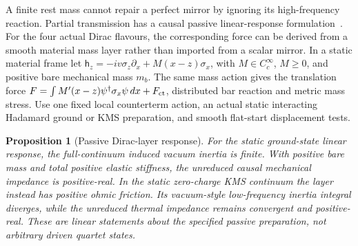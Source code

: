 \documentclass[12pt,a4paper]{article}
\newtheorem{proposition}[theorem]{Proposition}
\begin{document}
A finite rest mass cannot repair a perfect mirror by ignoring its
high-frequency reaction. Partial transmission has a causal passive
linear-response formulation~\cite{JaekelReynaud1992}. For the four
actual Dirac flavours, the corresponding force can be derived from a
smooth material mass layer rather than imported from a scalar mirror.
In a static material frame let
$\mathsf h_z=-iv\sigma_z\partial_x+M(x-z)\sigma_x$, with
$M\in C_c^\infty$, $M\ge0$, and positive bare mechanical mass $m_b$.
The same mass action gives the translation force
$F=\int M'(x-z)\psi^\dagger\sigma_x\psi\,dx+F_{\rm ct}$,
distributed bar reaction and metric mass stress. Use one fixed local
counterterm action, an actual static interacting Hadamard ground or
KMS preparation, and smooth flat-start displacement tests.

\begin{proposition}[Passive Dirac-layer response]
\label{prop:Dirac-wall-passivity}
For the static ground-state linear response, the full-continuum induced
vacuum inertia is finite. With positive bare mass and total positive
elastic stiffness, the unreduced causal mechanical impedance is
positive-real. In the static zero-charge KMS continuum the layer instead
has positive ohmic friction. Its vacuum-style low-frequency inertia
integral diverges, while the unreduced thermal impedance remains
convergent and positive-real. These are linear statements about the
specified passive preparation, not arbitrary driven quartet states.
\end{proposition}
\end{document}
